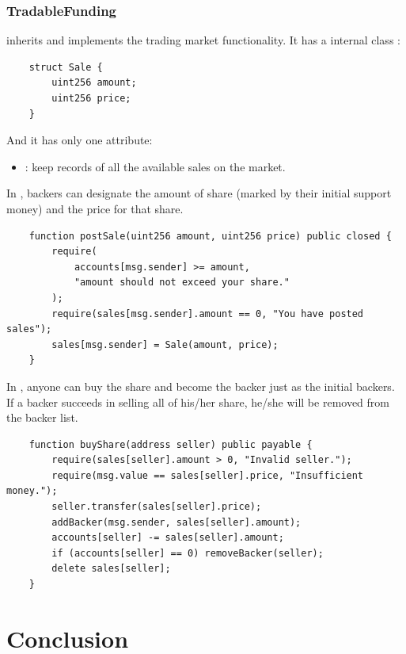 \documentclass{article}
\begin{document}
\subsubsection{TradableFunding}
 inherits  and implements the trading market functionality. It has a internal class :
\begin{lstlisting}
    struct Sale {
        uint256 amount;
        uint256 price;
    }
\end{lstlisting}

And it has only one attribute:
\begin{itemize}
    \item {}: keep records of all the available sales on the market.
\end{itemize}

In , backers can designate the amount of share (marked by their initial support money) and the price for that share. 
\begin{lstlisting}
    function postSale(uint256 amount, uint256 price) public closed {
        require(
            accounts[msg.sender] >= amount,
            "amount should not exceed your share."
        );
        require(sales[msg.sender].amount == 0, "You have posted sales");
        sales[msg.sender] = Sale(amount, price);
    }
\end{lstlisting}

In , anyone can buy the share and become the backer just as the initial backers. If a backer succeeds in selling all of his/her share, he/she will be removed from the backer list.
\begin{lstlisting}
    function buyShare(address seller) public payable {
        require(sales[seller].amount > 0, "Invalid seller.");
        require(msg.value == sales[seller].price, "Insufficient money.");
        seller.transfer(sales[seller].price);
        addBacker(msg.sender, sales[seller].amount);
        accounts[seller] -= sales[seller].amount;
        if (accounts[seller] == 0) removeBacker(seller);
        delete sales[seller];
    }
\end{lstlisting}


\section{Conclusion}


\end{document}
